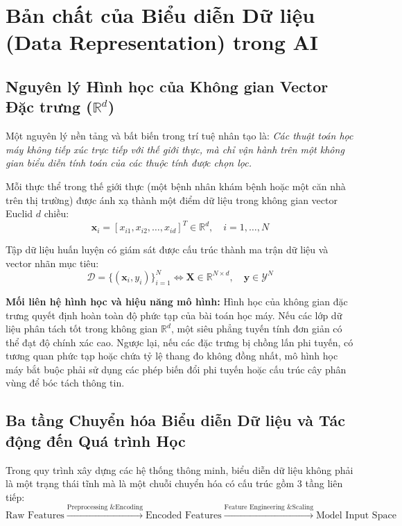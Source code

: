 \documentclass[12pt,a4paper]{report}
\begin{document}
\section{Bản chất của Biểu diễn Dữ liệu (Data Representation) trong AI}

\subsection{Nguyên lý Hình học của Không gian Vector Đặc trưng ($\mathbb{R}^d$)}
Một nguyên lý nền tảng và bất biến trong trí tuệ nhân tạo là: \textit{Các thuật toán học máy không tiếp xúc trực tiếp với thế giới thực, mà chỉ vận hành trên một không gian biểu diễn tính toán của các thuộc tính được chọn lọc.} 

Mỗi thực thể trong thế giới thực (một bệnh nhân khám bệnh hoặc một căn nhà trên thị trường) được ánh xạ thành một điểm dữ liệu trong không gian vector Euclid $d$ chiều:
\begin{equation}
\mathbf{x}_i = [x_{i1}, x_{i2}, \dots, x_{id}]^T \in \mathbb{R}^d, \quad i = 1, \dots, N
\end{equation}

Tập dữ liệu huấn luyện có giám sát được cấu trúc thành ma trận dữ liệu và vector nhãn mục tiêu:
\begin{equation}
\mathcal{D} = \{(\mathbf{x}_i, y_i)\}_{i=1}^N \iff \mathbf{X} \in \mathbb{R}^{N \times d}, \quad \mathbf{y} \in \mathcal{Y}^N
\end{equation}

\textbf{Mối liên hệ hình học và hiệu năng mô hình:} Hình học của không gian đặc trưng quyết định hoàn toàn độ phức tạp của bài toán học máy. Nếu các lớp dữ liệu phân tách tốt trong không gian $\mathbb{R}^d$, một siêu phẳng tuyến tính đơn giản có thể đạt độ chính xác cao. Ngược lại, nếu các đặc trưng bị chồng lấn phi tuyến, có tương quan phức tạp hoặc chứa tỷ lệ thang đo không đồng nhất, mô hình học máy bắt buộc phải sử dụng các phép biến đổi phi tuyến hoặc cấu trúc cây phân vùng để bóc tách thông tin.

\subsection{Ba tầng Chuyển hóa Biểu diễn Dữ liệu và Tác động đến Quá trình Học}
Trong quy trình xây dựng các hệ thống thông minh, biểu diễn dữ liệu không phải là một trạng thái tĩnh mà là một chuỗi chuyển hóa có cấu trúc gồm 3 tầng liên tiếp:
\begin{equation}
\text{Raw Features} \xrightarrow{\text{Preprocessing \& Encoding}} \text{Encoded Features} \xrightarrow{\text{Feature Engineering \& Scaling}} \text{Model Input Space}
\end{equation}
\end{document}
